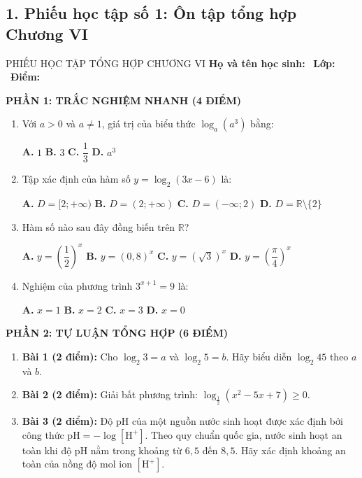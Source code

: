 \documentclass[12pt, a4paper]{article}
\begin{document}
\subsection*{1. Phiếu học tập số 1: Ôn tập tổng hợp Chương VI}

\begin{pedabox}{PHIẾU HỌC TẬP TỔNG HỢP CHƯƠNG VI}
\textbf{Họ và tên học sinh:} \dotfill \ \textbf{Lớp:} \dotfill \ \textbf{Điểm:} \dotfill

\noindent \textbf{PHẦN 1: TRẮC NGHIỆM NHANH (4 ĐIỂM)}
\begin{enumerate}[leftmargin=0.6cm]
    \item Với $a > 0$ và $a \neq 1$, giá trị của biểu thức $\log_a (a^3)$ bằng:
    \begin{center}
    \textbf{A.} $1$ \qquad \qquad \textbf{B.} $3$ \qquad \qquad \textbf{C.} $\dfrac{1}{3}$ \qquad \qquad \textbf{D.} $a^3$
    \end{center}
    \item Tập xác định của hàm số $y = \log_2 (3x - 6)$ là:
    \begin{center}
    \textbf{A.} $D = [2; +\infty)$ \qquad \textbf{B.} $D = (2; +\infty)$ \qquad \textbf{C.} $D = (-\infty; 2)$ \qquad \textbf{D.} $D = \mathbb{R} \setminus \{2\}$
    \end{center}
    \item Hàm số nào sau đây đồng biến trên $\mathbb{R}$?
    \begin{center}
    \textbf{A.} $y = \left(\dfrac{1}{2}\right)^x$ \qquad \textbf{B.} $y = (0{,}8)^x$ \qquad \textbf{C.} $y = (\sqrt{3})^x$ \qquad \textbf{D.} $y = \left(\dfrac{\pi}{4}\right)^x$
    \end{center}
    \item Nghiệm của phương trình $3^{x+1} = 9$ là:
    \begin{center}
    \textbf{A.} $x = 1$ \qquad \qquad \textbf{B.} $x = 2$ \qquad \qquad \textbf{C.} $x = 3$ \qquad \qquad \textbf{D.} $x = 0$
    \end{center}
\end{enumerate}

\noindent \textbf{PHẦN 2: TỰ LUẬN TỔNG HỢP (6 ĐIỂM)}
\begin{enumerate}[leftmargin=0.6cm]
    \item \textbf{Bài 1 (2 điểm):} Cho $\log_2 3 = a$ và $\log_2 5 = b$. Hãy biểu diễn $\log_2 45$ theo $a$ và $b$.
    \item \textbf{Bài 2 (2 điểm):} Giải bất phương trình: $\log_{\frac{1}{2}} (x^2 - 5x + 7) \ge 0$.
    \item \textbf{Bài 3 (2 điểm):} Độ pH của một nguồn nước sinh hoạt được xác định bởi công thức $\text{pH} = -\log[\text{H}^+]$. Theo quy chuẩn quốc gia, nước sinh hoạt an toàn khi độ pH nằm trong khoảng từ $6{,}5$ đến $8{,}5$. Hãy xác định khoảng an toàn của nồng độ mol ion $[\text{H}^+]$.
\end{enumerate}
\end{pedabox}
\end{document}
